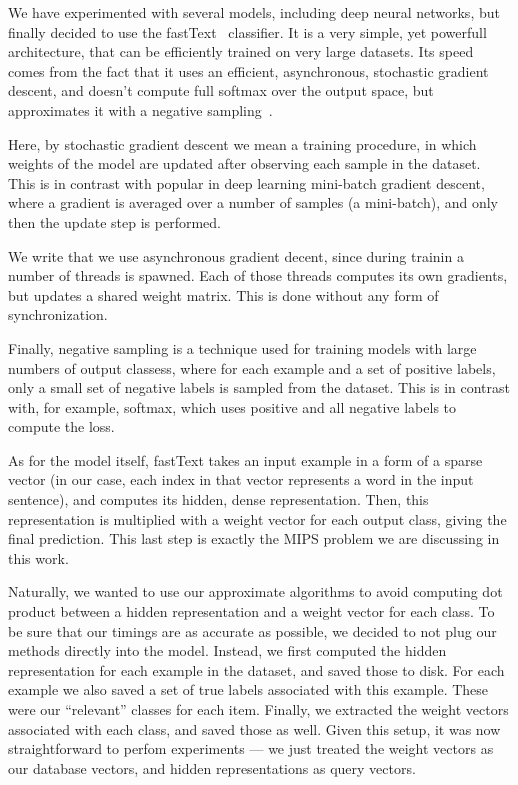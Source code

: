         We have experimented with several models, including deep neural networks, but finally decided to
        use the fastText~\cite{fasttext} classifier. It is a very simple, yet powerfull architecture, that
        can be efficiently trained on very large datasets. Its speed comes from the fact that it uses an efficient,
        asynchronous, stochastic gradient descent, and doesn't compute full softmax over the output space,
        but approximates it with a negative sampling~\cite{w2v}.

        Here, by stochastic gradient descent we mean a training procedure, in which weights of the model are updated
        after observing each sample in the dataset. This is in contrast with popular in deep learning
        mini-batch gradient descent, where a gradient is averaged over a number of samples (a mini-batch),
        and only then the update step is performed.

        We write that we use asynchronous gradient decent, since during trainin a number of threads is spawned. Each
        of those threads computes its own gradients, but updates a shared weight matrix. This is done without any
        form of synchronization.

        Finally, negative sampling is a technique used for training models with large numbers of output classess, where
        for each example and a set of positive labels, only a small set of negative labels is sampled from the dataset.
        This is in contrast with, for example, softmax, which uses positive and all negative labels to compute the loss.

        As for the model itself, fastText takes an input example in a form of a sparse vector
        (in our case, each index in that vector represents a word in the input sentence), and computes its hidden,
        dense representation. Then, this representation is multiplied with a weight vector for each output class,
        giving the final prediction. This last step is exactly the MIPS problem we are discussing in this work.

        Naturally, we wanted to use our approximate algorithms to avoid computing dot product between a hidden
        representation and a weight vector for each class. To be sure that our timings are as accurate as possible,
        we decided to not plug our methods directly into the model. Instead, we first computed the hidden representation
        for each example in the dataset, and saved those to disk. For each example we also saved a set of
        true labels associated with this example. These were our ``relevant'' classes for each item.
        Finally, we extracted the weight vectors associated with each class, and saved those as well. Given this setup,
        it was now straightforward to perfom experiments --- we just treated the weight vectors as our database vectors,
        and hidden representations as query vectors.

